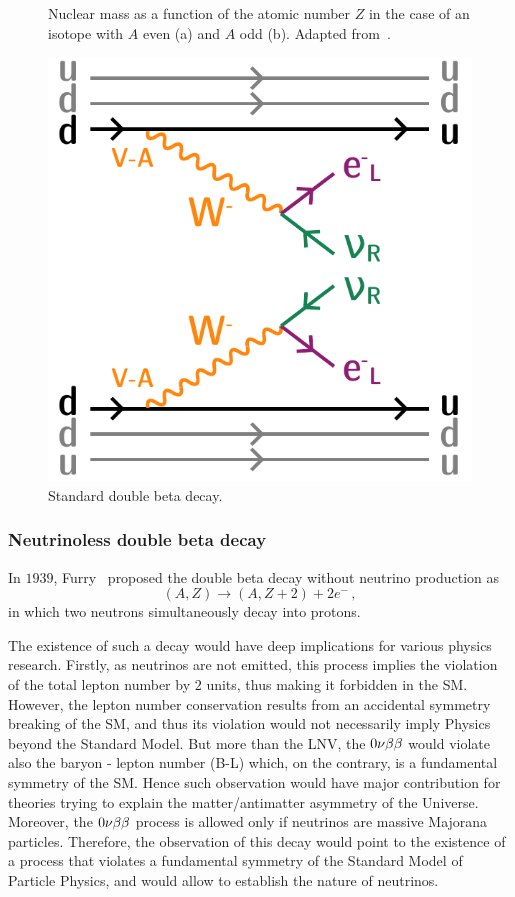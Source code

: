 \begin{figure}[h]
\begin{subfigure}[t]{0.48\textwidth}
    \captionsetup{justification=justified}
    \caption{
      \label{subfig:}}
  \end{subfigure}
  \caption{Nuclear mass as a function of the atomic number $Z$ in the case of an isotope with $A$ even (a) and $A$ odd (b).
    Adapted from~\cite{art:delloro_2015}.
    \label{fig:2nu_even_odd}
  }
\end{figure}

\begin{figure}[h!]
  \centering
    \includegraphics[height=0.4\textwidth]{neutrinophysics/fig_neutrinophysics/2nubb_diagram.pdf}
  \caption{Standard double beta decay.
    \label{fig:2nu_diagram}}
\end{figure}


\subsubsection*{Neutrinoless double beta decay}

In $1939$, Furry~\cite{art:furry_1939} proposed the double beta decay without neutrino production as
\begin{equation}
(A,Z)\rightarrow (A,Z+2)+2e^{-}\,,
\end{equation}
in which two neutrons simultaneously decay into protons.

The existence of such a decay would have deep implications for various physics research.
Firstly, as neutrinos are not emitted, this process implies the violation of the total lepton number by $2$ units, thus making it forbidden in the SM.
However, the lepton number conservation results from an accidental symmetry breaking of the SM, and thus its violation would not necessarily imply Physics beyond the Standard Model.
But more than the LNV, the $0\nu\beta\beta$ would violate also the baryon - lepton number (B-L) which, on the contrary, is a fundamental symmetry of the SM.
Hence such observation would have major contribution for theories trying to explain the matter/antimatter asymmetry of the Universe.
Moreover, the $0\nu\beta\beta$ process is allowed only if neutrinos are massive Majorana particles.
Therefore, the observation of this decay would point to the existence of a process that violates a fundamental symmetry of the Standard Model of Particle Physics, and would allow to establish the nature of neutrinos.

